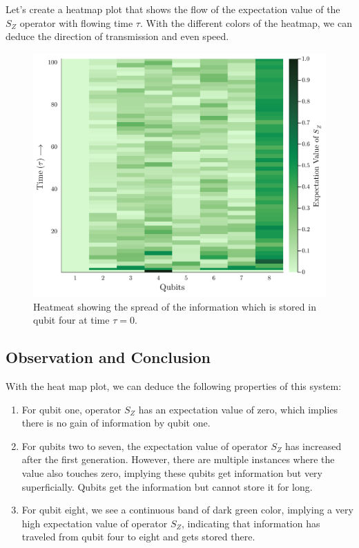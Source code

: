 \documentclass[11pt, oneside, listof=totoc]{scrbook}
\begin{document}
Let's create a heatmap plot that shows the flow of the expectation value of the \(S_Z\) operator with flowing time \(\tau\). With the different colors of the heatmap, we can deduce the direction of transmission and even speed.
\begin{figure}[H]
    \centering
    \includegraphics[width=\textwidth]{spread-Sz.png}
    \caption{Heatmeat showing the spread of the information which is stored in qubit four at time \(\tau = 0\).}
    \label{fig:spread}
\end{figure}

\subsection{Observation and Conclusion}
With the heat map plot, we can deduce the following properties of this system:
\begin{enumerate}
    \item For qubit one, operator \(S_Z\) has an expectation value of zero, which implies there is no gain of information by qubit one.

    \item For qubits two to seven, the expectation value of operator \(S_Z\) has increased after the first generation. However, there are multiple instances where the value also touches zero, implying these qubits get information but very superficially. Qubits get the information but cannot store it for long.

    \item For qubit eight, we see a continuous band of dark green color, implying a very high expectation value of operator \(S_Z\), indicating that information has traveled from qubit four to eight and gets stored there.
\end{enumerate}
\end{document}

